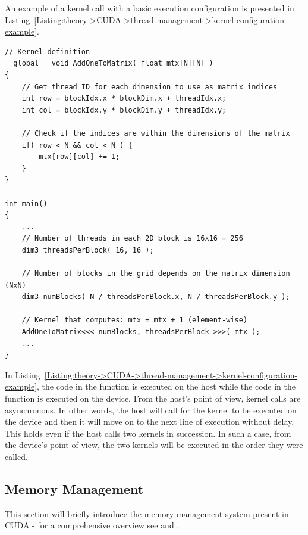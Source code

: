 An example of a kernel call with a basic execution configuration is presented in Listing~\ref{Listing:theory->CUDA->thread-management->kernel-configuration-example}.

\begin{lstlisting}[caption={Excerpt of C++ code portraying the creation of a grid configuration and the launching of a kernel.
The example implemented aims to increment every value of the \code{N}-by-\code{N} matrix \code{mtx} by 1 using the device. \code{dim3} is an integer vector type based on \code{uint3} that is used to specify dimensions - unspecified components are implicitly set to 1 \cite{NVIDIADecember2022}.
Taken from \citetitle{NVIDIADecember2022} \cite{NVIDIADecember2022}.},label={Listing:theory->CUDA->thread-management->kernel-configuration-example}]
// Kernel definition
__global__ void AddOneToMatrix( float mtx[N][N] )
{
	// Get thread ID for each dimension to use as matrix indices
	int row = blockIdx.x * blockDim.x + threadIdx.x;
	int col = blockIdx.y * blockDim.y + threadIdx.y;
	
	// Check if the indices are within the dimensions of the matrix
	if( row < N && col < N ) {
		mtx[row][col] += 1;
	}
}

int main()
{
	...
	// Number of threads in each 2D block is 16x16 = 256
	dim3 threadsPerBlock( 16, 16 );
	
	// Number of blocks in the grid depends on the matrix dimension (NxN)
	dim3 numBlocks( N / threadsPerBlock.x, N / threadsPerBlock.y );
	
	// Kernel that computes: mtx = mtx + 1 (element-wise)
	AddOneToMatrix<<< numBlocks, threadsPerBlock >>>( mtx );
	...
}
\end{lstlisting}

In Listing~\ref{Listing:theory->CUDA->thread-management->kernel-configuration-example}, the code in the  function is executed on the host while the code in the  function is executed on the device.
From the host's point of view, kernel calls are asynchronous.
In other words, the host will call for the kernel to be executed on the device and then it will move on to the next line of execution without delay.
This holds even if the host calls two kernels in succession.
In such a case, from the device's point of view, the two kernels will be executed in the order they were called.

\subsection{Memory Management}\label{Subsection:theory->CUDA->memory-management}
This section will briefly introduce the memory management system present in CUDA - for a comprehensive overview see  \cite{Cejka2020} and  \cite{Cejka2022}.

